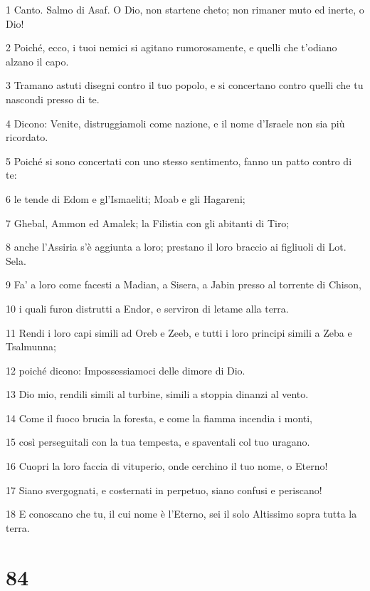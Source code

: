 \par 1 Canto. Salmo di Asaf. O Dio, non startene cheto; non rimaner muto ed inerte, o Dio!
\par 2 Poiché, ecco, i tuoi nemici si agitano rumorosamente, e quelli che t'odiano alzano il capo.
\par 3 Tramano astuti disegni contro il tuo popolo, e si concertano contro quelli che tu nascondi presso di te.
\par 4 Dicono: Venite, distruggiamoli come nazione, e il nome d'Israele non sia più ricordato.
\par 5 Poiché si sono concertati con uno stesso sentimento, fanno un patto contro di te:
\par 6 le tende di Edom e gl'Ismaeliti; Moab e gli Hagareni;
\par 7 Ghebal, Ammon ed Amalek; la Filistia con gli abitanti di Tiro;
\par 8 anche l'Assiria s'è aggiunta a loro; prestano il loro braccio ai figliuoli di Lot. Sela.
\par 9 Fa' a loro come facesti a Madian, a Sisera, a Jabin presso al torrente di Chison,
\par 10 i quali furon distrutti a Endor, e serviron di letame alla terra.
\par 11 Rendi i loro capi simili ad Oreb e Zeeb, e tutti i loro principi simili a Zeba e Tsalmunna;
\par 12 poiché dicono: Impossessiamoci delle dimore di Dio.
\par 13 Dio mio, rendili simili al turbine, simili a stoppia dinanzi al vento.
\par 14 Come il fuoco brucia la foresta, e come la fiamma incendia i monti,
\par 15 così perseguitali con la tua tempesta, e spaventali col tuo uragano.
\par 16 Cuopri la loro faccia di vituperio, onde cerchino il tuo nome, o Eterno!
\par 17 Siano svergognati, e costernati in perpetuo, siano confusi e periscano!
\par 18 E conoscano che tu, il cui nome è l'Eterno, sei il solo Altissimo sopra tutta la terra.

\chapter{84}

